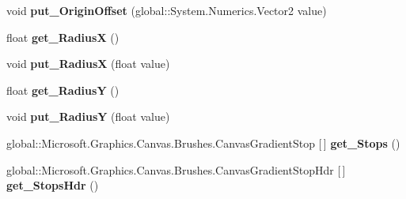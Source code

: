\begin{DoxyCompactItemize}
\mbox{\label{class_microsoft_1_1_graphics_1_1_canvas_1_1_brushes_1_1_canvas_radial_gradient_brush_ab81418298a8dbc0342347dc836ff9a7f}} 
void {\bfseries put\+\_\+\+Origin\+Offset} (global\+::\+System.\+Numerics.\+Vector2 value)
\item 
\mbox{\label{class_microsoft_1_1_graphics_1_1_canvas_1_1_brushes_1_1_canvas_radial_gradient_brush_ab3f2ca13e2e3fd0c9e7e0e4efe610986}} 
float {\bfseries get\+\_\+\+RadiusX} ()
\item 
\mbox{\label{class_microsoft_1_1_graphics_1_1_canvas_1_1_brushes_1_1_canvas_radial_gradient_brush_a3d2394346ef1bc117f4efc7d048cac54}} 
void {\bfseries put\+\_\+\+RadiusX} (float value)
\item 
\mbox{\label{class_microsoft_1_1_graphics_1_1_canvas_1_1_brushes_1_1_canvas_radial_gradient_brush_ab16579481fb9a46fbbe0ea305fedfdf1}} 
float {\bfseries get\+\_\+\+RadiusY} ()
\item 
\mbox{\label{class_microsoft_1_1_graphics_1_1_canvas_1_1_brushes_1_1_canvas_radial_gradient_brush_a9d06155d0a12e95fc34c5bd238d7a02d}} 
void {\bfseries put\+\_\+\+RadiusY} (float value)
\item 
\mbox{\label{class_microsoft_1_1_graphics_1_1_canvas_1_1_brushes_1_1_canvas_radial_gradient_brush_a53f77c4a4f9752f5063e83fdef3afefe}} 
global\+::\+Microsoft.\+Graphics.\+Canvas.\+Brushes.\+Canvas\+Gradient\+Stop \mbox{[}$\,$\mbox{]} {\bfseries get\+\_\+\+Stops} ()
\item 
\mbox{\label{class_microsoft_1_1_graphics_1_1_canvas_1_1_brushes_1_1_canvas_radial_gradient_brush_a9e5998caecc47d8624cf0d050855dbd1}} 
global\+::\+Microsoft.\+Graphics.\+Canvas.\+Brushes.\+Canvas\+Gradient\+Stop\+Hdr \mbox{[}$\,$\mbox{]} {\bfseries get\+\_\+\+Stops\+Hdr} ()

\end{DoxyCompactItemize}
